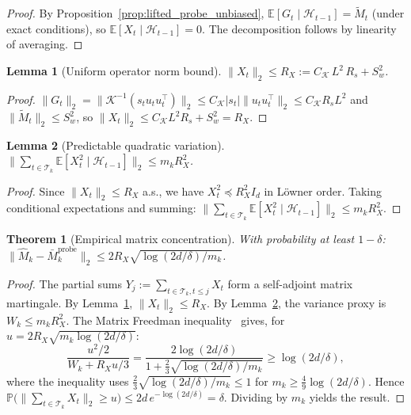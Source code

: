 \documentclass[11pt]{article}
\newcommand{\E}{\mathbb{E}}
\newcommand{\Prob}{\mathbb{P}}
\newcommand{\cH}{\mathcal{H}}
\newcommand{\cT}{\mathcal{T}}
\newtheorem{lemma}{Lemma}
\newtheorem{theorem}{Theorem}
\begin{document}
\begin{proof}
By Proposition~\ref{prop:lifted_probe_unbiased},
$\E[G_t\mid\cH_{t-1}]=\widetilde{M}_t$ (under exact conditions), so
$\E[X_t\mid\cH_{t-1}]=0$.
The decomposition follows by linearity of averaging.
\end{proof}

\begin{lemma}[Uniform operator norm bound]
\label{lem:uniform_operator_bound}
$\|X_t\|_2\le R_X := C_{\mathcal{K}}\,L^2\,R_s + S_w^2$.
\end{lemma}

\begin{proof}
$\|G_t\|_2 = \|\mathcal{K}^{-1}(s_tu_tu_t^\top)\|_2
\le C_{\mathcal{K}}|s_t|\|u_tu_t^\top\|_2
\le C_{\mathcal{K}}R_sL^2$ and
$\|\widetilde{M}_t\|_2\le S_w^2$, so
$\|X_t\|_2\le C_{\mathcal{K}}L^2R_s + S_w^2 = R_X$.
\end{proof}

\begin{lemma}[Predictable quadratic variation]
\label{lem:variance_bound}
$\|\sum_{t\in\cT_k}\E[X_t^2\mid\cH_{t-1}]\|_2\le m_k R_X^2$.
\end{lemma}

\begin{proof}
Since $\|X_t\|_2\le R_X$ a.s., we have $X_t^2\preceq R_X^2 I_d$ in L\"owner order.
Taking conditional expectations and summing:
$\|\sum_{t\in\cT_k}\E[X_t^2\mid\cH_{t-1}]\|_2\le m_kR_X^2$.
\end{proof}

\begin{theorem}[Empirical matrix concentration]
\label{thm:matrix_concentration_summary}
With probability at least $1-\delta$:
$\|\widehat{M}_k-\bar{M}_k^{\mathrm{probe}}\|_2
\le 2R_X\sqrt{\log(2d/\delta)/m_k}$.
\end{theorem}

\begin{proof}
The partial sums $Y_j:=\sum_{t\in\cT_k,t\le j}X_t$ form a self-adjoint matrix
martingale.
By Lemma~\ref{lem:uniform_operator_bound}, $\|X_t\|_2\le R_X$.
By Lemma~\ref{lem:variance_bound}, the variance proxy is $W_k\le m_kR_X^2$.
The Matrix Freedman inequality~\citep{tropp2012user} gives, for
$u=2R_X\sqrt{m_k\log(2d/\delta)}$:
\[
\frac{u^2/2}{W_k+R_Xu/3}
= \frac{2\log(2d/\delta)}{1+\tfrac{2}{3}\sqrt{\log(2d/\delta)/m_k}}
\ge\log(2d/\delta),
\]
where the inequality uses $\tfrac{2}{3}\sqrt{\log(2d/\delta)/m_k}\le 1$ for
$m_k\ge\tfrac{4}{9}\log(2d/\delta)$.
Hence
$\Prob\bigl(\|\sum_{t\in\cT_k}X_t\|_2\ge u\bigr)
\le 2d\,e^{-\log(2d/\delta)}=\delta$.
Dividing by $m_k$ yields the result.
\end{proof}
\end{document}
